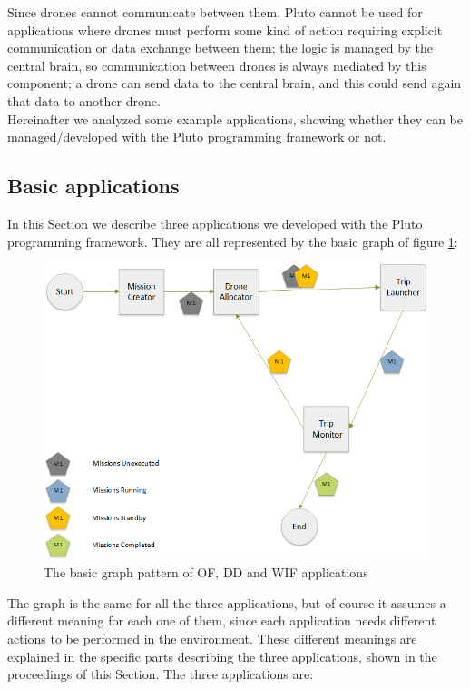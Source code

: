 Since drones cannot communicate between them, Pluto cannot be used for applications where drones must perform some kind of action requiring explicit communication or data exchange between them; the logic is managed by the central brain, so communication between drones is always mediated by this component; a drone can send data to the central brain, and this could send again that data to another drone.
\\
Hereinafter we analyzed some  example applications, showing whether they can be managed/developed with the Pluto programming framework or not.
\\

\subsection{Basic applications}

In this Section we describe three applications we developed with the Pluto programming framework.
They are all represented by the basic graph of figure \ref{fig:basicGraph}:

\begin{figure}[H]
  \centering
  \includegraphics[width=\linewidth]{pictures/BasicBlocksDiagram.png}
  \caption{The basic graph pattern of OF, DD and WIF applications}
  \label{fig:basicGraph}
\end{figure}

The graph is the same for all the three applications, but of course it assumes a different meaning for each one of them, since each application needs different actions to be performed in the environment.
These different meanings are explained in the specific parts describing the three applications, shown in the proceedings of this Section.
The three applications are:


